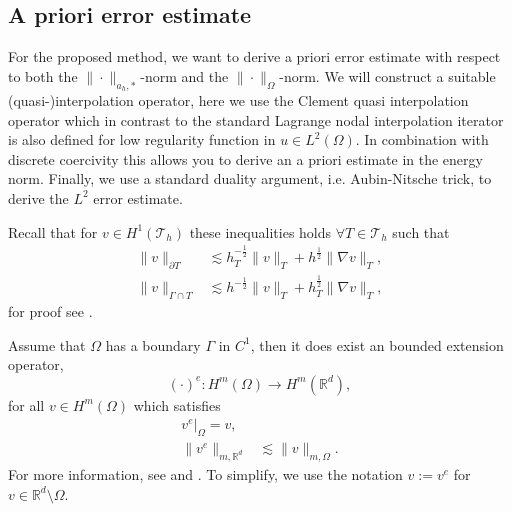 
\subsection{A priori error estimate}%
\label{sec:a_priori_estimates}


For the proposed method, we want to derive a priori error estimate with respect to both the  $\| \cdot  \|_{a_{h},*   }^{  } $-norm and the  $\| \cdot  \|_{ \Omega  }^{
} $-norm.
We will construct a suitable (quasi-)interpolation operator, here we use the Clement quasi interpolation operator which in contrast to the standard Lagrange nodal interpolation iterator is also defined for low regularity function in $u \in L^{2}(
\Omega ) $.
In combination with discrete coercivity this allows you to derive an a priori estimate in the energy norm. Finally, we use a standard duality argument, i.e. Aubin-Nitsche trick, to derive the $L^{2}$ error estimate.

Recall that for $v \in H^{1}( \mathcal{T } _{h}) $ these inequalities holds $\forall T \in \mathcal{T} _{h}$ such that \[
\begin{split}
    \| v \|_{ \partial T }^{  } &\lesssim h^{-\frac{1}{2}}_{T}\|  v \|_{ T }^{  }+ h^{\frac{1}{2}} \| \nabla v \|_{T  }^{   }  , \\
    \| v \|_{ \Gamma \cap T }^{  } &\lesssim  h^{-\frac{1}{2}} \| v \|_{T  }^{  }   + h^{\frac{1}{2}}_{T} \| \nabla v \|_{ T }^{  },
\end{split}
\]
for proof see \cite[Lemma 4.2]{hansbo2003finite}.

Assume that $\Omega $ has a boundary $\Gamma $ in $C^{1}$, then it does exist an bounded extension operator, \[
    ( \cdot ) ^{e}: H^{m}( \Omega )  \to H^{m} ( \mathbb{R} ^{d}),
\]
for all  $v \in H^{m}( \Omega )$ which satisfies
\begin{equation}
    \begin{split}
 v^{e}| _{\Omega } =   v,  \\
\| v^{e} \|_{ m,\mathbb{R} ^{d}  }^{  } & \lesssim \| v \|_{ m, \Omega  }^{  }.
    \end{split}
\end{equation}
For more information, see \cite[Theorem 9.7]{brezis2011functional} and \cite[p.181, p.185]{stein1970singular}. To simplify, we use the notation $ v := v^{e}   $ for $v \in \mathbb{R} ^{d} \setminus \Omega $.

